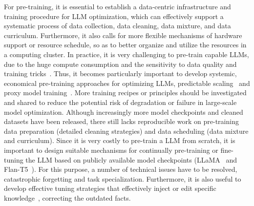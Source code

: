 For pre-training, it is essential to establish a data-centric infrastructure and training procedure for LLM optimization, which can effectively support a systematic process of data collection, data cleaning, data mixture, and data  curriculum. Furthermore, it also calls for more flexible mechanisms of hardware support or resource schedule, so as to better organize and utilize the resources in a computing cluster. 
In  practice, it is very  challenging to pre-train capable LLMs, due to the huge compute consumption and the sensitivity to data quality and  training tricks~\cite{Zeng-arxiv-2022-GLM,Scao-arxiv-2022-BLOOM}. 
Thus, it becomes particularly important to develop systemic, economical pre-training approaches for optimizing LLMs, \eg predictable scaling~\cite{OpenAI-OpenAI-2023-GPT-4} and proxy model training~\cite{Xie-arxiv-2023-doremi}.  %
More training recipes or principles should be investigated and shared to reduce the potential  risk of degradation or failure in large-scale model optimization.  
Although increasingly more model checkpoints and cleaned datasets have been released, there still lacks  reproducible work on pre-training data preparation (\eg detailed cleaning strategies) and data scheduling (\eg data mixture and curriculum).   %
Since it is very costly to pre-train a LLM from scratch, it is  important to design suitable mechanisms for continually pre-training or fine-tuning the LLM based on publicly available model checkpoints (\eg LLaMA~\cite{Touvron-arxiv-2023-LLaMA} and Flan-T5~\cite{Chung-arxiv-2022-Scaling}).    
For this purpose, a number of technical issues have to be resolved, \eg  catastrophic forgetting and task specialization.   
{Furthermore, it is also useful to develop effective tuning strategies that effectively inject or edit specific knowledge~\cite{Yao-arxiv-2023-Editing}, \eg correcting the outdated facts.}




